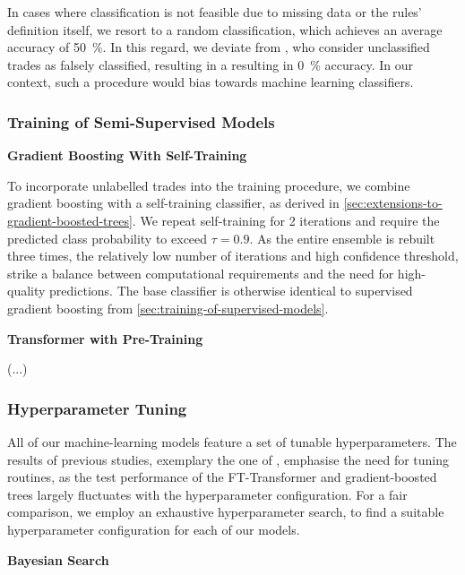 In cases where classification is not feasible due to missing data or the rules' definition itself, we resort to a random classification, which achieves an average accuracy of \SI{50}{\percent}. In this regard, we deviate from \textcite[][29--32]{grauerOptionTradeClassification2022}, who consider unclassified trades as falsely classified, resulting in a resulting in \SI{0}{\percent} accuracy. In our context, such a procedure would bias towards machine learning classifiers.

\subsubsection{Training of Semi-Supervised
    Models}\label{sec:training-of-semi-supervised-models}

\textbf{Gradient Boosting With Self-Training}

To incorporate unlabelled trades into the training procedure, we combine gradient boosting with a self-training classifier, as derived in \cref{sec:extensions-to-gradient-boosted-trees}. We repeat self-training for 2 iterations and require the predicted class probability to exceed $\tau=0.9$. As the entire ensemble is rebuilt three times, the relatively low number of iterations and high confidence threshold, strike a balance between computational requirements and the need for high-quality predictions. The base classifier is otherwise identical to supervised gradient boosting from \cref{sec:training-of-supervised-models}.

\textbf{Transformer with Pre-Training}

(...)

\subsubsection{Hyperparameter Tuning}\label{sec:hyperparameter-tuning}

All of our machine-learning models feature a set of tunable hyperparameters. The results of previous studies, exemplary the one of \textcite[][5]{grinsztajnWhyTreebasedModels2022}, emphasise the need for tuning routines, as the test performance of the FT-Transformer and gradient-boosted trees largely fluctuates with the hyperparameter configuration. For a fair comparison, we employ an exhaustive hyperparameter search, to find a suitable hyperparameter configuration for each of our models.

\textbf{Bayesian Search}

